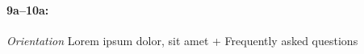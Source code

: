 \paragraph{9a--10a:}
\textit{Orientation}
Lorem ipsum dolor, sit amet\textit{}
  + Frequently asked questions